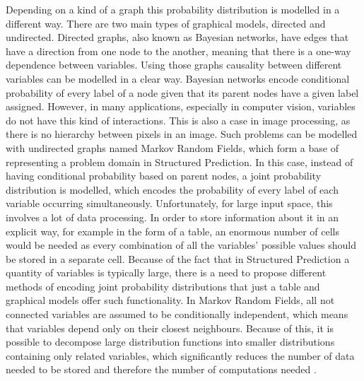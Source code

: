 Depending on a kind of a graph this probability distribution is modelled in a different way. There are two main types of graphical models, directed and undirected. Directed graphs, also known as Bayesian networks, have edges that have a direction from one node to the another, meaning that there is a one-way dependence between variables. Using those graphs causality between different variables can be modelled in a clear way. Bayesian networks encode conditional probability of every label of a node given that its parent nodes have a given label assigned. However, in many applications, especially in computer vision, variables do not have this kind of interactions. This is also a case in image processing, as there is no hierarchy between pixels in an image. Such problems can be modelled with undirected graphs named Markov Random Fields, which form a base of representing a problem domain in Structured Prediction. In this case,  instead of having conditional probability based on parent nodes, a joint probability distribution is modelled, which encodes the probability of every label of each variable occurring simultaneously. Unfortunately, for large input space, this involves a lot of data processing. In order to store information about it in an explicit way, for example in the form of a table, an enormous number of cells would be needed as every combination of all the variables’ possible values should be stored in a separate cell. Because of the fact that in Structured Prediction a quantity of variables is typically large, there is a need to propose different methods of encoding joint probability distributions that just a table and graphical models offer such functionality. In Markov Random Fields, all not connected variables are assumed to be conditionally independent, which means that variables depend only on their closest neighbours. Because of this, it is possible to decompose large distribution functions into smaller distributions containing only related variables, which significantly reduces the number of data needed to be stored and therefore the number of computations needed \cite{causality_pearl}. 
